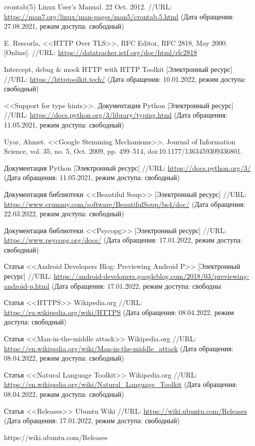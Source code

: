 \documentclass[a4paper,12pt]{article}
\begin{document}
  \begin{CRTbibliography}
    crontab(5) Linux User's Manual. 22 Oct. 2012.
    //URL: \url{https://man7.org/linux/man-pages/man5/crontab.5.html}
    (Дата обращения: 27.08.2021, режим доступа: свободный)

    E. Rescorla, <<HTTP Over TLS>>, RFC Editor, RFC 2818, May 2000. [Online].
    //URL: \url{https://datatracker.ietf.org/doc/html/rfc2818}

    Intercept, debug \& mock HTTP with HTTP Toolkit [Электронный ресурс]
    //URL: \url{https://httptoolkit.tech/}
    (Дата обращения: 10.01.2022, режим доступа: свободный)

    <<Support for type hints>>. Документация Python [Электронный ресурс]
    //URL: \url{https://docs.python.org/3/library/typing.html}
    (Дата обращения: 11.05.2021, режим доступа: свободный)

    Uyar, Ahmet. <<Google Stemming Mechanisms>>.
    Journal of Information Science, vol. 35, no. 5, Oct. 2009, pp. 499--514, doi:10.1177/1363459309336801.

    Документация Python [Электронный ресурс]
    //URL: \url{https://docs.python.org/3/}
    (Дата обращения: 11.05.2021, режим доступа: свободный)

    Документация библиотеки <<Beautiful Soup>> [Электронный ресурс]
    //URL: \url{https://www.crummy.com/software/BeautifulSoup/bs4/doc/}
    (Дата обращения: 22.03.2022, режим доступа: свободный)

    Документация библиотеки <<Psycopg>> [Электронный ресурс]
    //URL: \url{https://www.psycopg.org/docs/}
    (Дата обращения: 17.01.2022, режим доступа: свободный)

    Статья <<Android Developers Blog: Previewing Android P>> [Электронный ресурс]
    //URL: \url{https://android-developers.googleblog.com/2018/03/previewing-android-p.html}
    (Дата обращения: 17.01.2022, режим доступа: свободны

    Статья <<HTTPS>> Wikipedia.org
    //URL: \url{https://ru.wikipedia.org/wiki/HTTPS}
    (Дата обращения: 08.04.2022, режим доступа: свободный)

    Статья <<Man-in-the-middle attack>> Wikipedia.org
    //URL: \url{https://en.wikipedia.org/wiki/Man-in-the-middle_attack}
    (Дата обращения: 08.04.2022, режим доступа: свободный)

    Статья <<Natural Language Toolkit>> Wikipedia.org
    //URL: \url{https://en.wikipedia.org/wiki/Natural_Language_Toolkit}
    (Дата обращения: 08.04.2022, режим доступа: свободный)

    Статья <<Releases>> Ubuntu Wiki
    //URL: \url{https://wiki.ubuntu.com/Releases}
    (Дата обращения: 17.01.2022, режим доступа: свободный)

    https://wiki.ubuntu.com/Releases
  \end{CRTbibliography}
\end{document}
